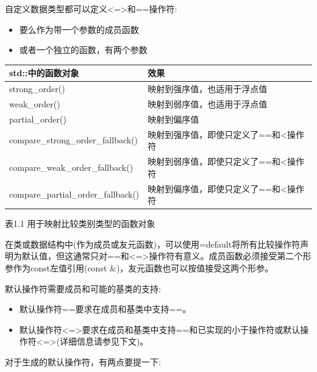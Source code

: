 

自定义数据类型都可以定义<=>和==操作符:

\begin{itemize}
\item
要么作为带一个参数的成员函数

\item
或者一个独立的函数，有两个参数
\end{itemize}


\begin{longtable}[c]{|l|l|}
\hline
\textbf{std::中的函数对象} & \textbf{效果}                                             \\ \hline
\endfirsthead
%
\endhead
%
strong\_order()                   & 映射到强序值，也适用于浮点值 \\ \hline
weak\_order()                     & 映射到弱序值，也适用于浮点值   \\ \hline
partial\_order()                  & 映射到偏序值                               \\ \hline
compare\_strong\_order\_fallback()  & 映射到强序值，即使只定义了==和<操作符  \\ \hline
compare\_weak\_order\_fallback()    & 映射到弱序值，即使只定义了==和<操作符    \\ \hline
compare\_partial\_order\_fallback() & 映射到偏序值，即使只定义了==和<操作符 \\ \hline
\end{longtable}

\begin{center}
表1.1 用于映射比较类别类型的函数对象
\end{center}



在类或数据结构中(作为成员或友元函数)，可以使用=default将所有比较操作符声明为默认值，但这通常只对==和<=>操作符有意义。成员函数必须接受第二个形参作为const左值引用(const \&)，友元函数也可以按值接受这两个形参。

默认操作符需要成员和可能的基类的支持:

\begin{itemize}
\item
默认操作符==要求在成员和基类中支持==。

\item
默认操作符<=>要求在成员和基类中支持==和已实现的小于操作符或默认操作符<=>(详细信息请参见下文)。
\end{itemize}

对于生成的默认操作符，有两点要提一下:

